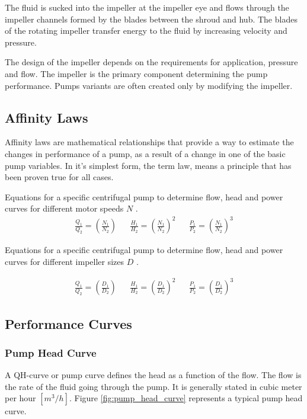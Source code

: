 The fluid is sucked into the impeller at the impeller eye and flows through the impeller channels formed by the 
blades between the shroud and hub.
The blades of the rotating impeller transfer energy to the fluid by increasing velocity and pressure.

The design of the impeller depends on the requirements for application, pressure and flow.
The impeller is the primary component determining the pump performance. 
Pumps variants are often created only by modifying the impeller.

\subsection{Affinity Laws}
Affinity laws are mathematical relationships that provide a way to estimate the changes in performance of a pump, 
as a result of a change in one of the basic pump variables.
In it's simplest form, the term law, means a principle that has been proven true for all cases.

Equations for a specific centrifugal pump to determine flow, head and power curves for different motor speeds $N$ \cite{Volk2014}.
\begin{align*}
	\frac{Q_1}{Q_2} = \left(\frac{N_1}{N_2}\right)   &&
	\frac{H_1}{H_2} = \left(\frac{N_1}{N_2}\right)^2 &&
	\frac{P_1}{P_2} = \left(\frac{N_1}{N_2}\right)^3	
\end{align*} 

Equations for a specific centrifugal pump to determine flow, head and power curves for different impeller sizes $D$ \cite{Volk2014}.

\begin{align*}
	\frac{Q_1}{Q_2} = \left(\frac{D_1}{D_2}\right)   &&
	\frac{H_1}{H_2} = \left(\frac{D_1}{D_2}\right)^2 &&
	\frac{P_1}{P_2} = \left(\frac{D_1}{D_2}\right)^3
\end{align*} 

\subsection{Performance Curves}
\subsubsection{Pump Head Curve}
A QH-curve or pump curve defines the head as a function of the flow. The flow is the rate of the fluid going through the 
pump. It is generally stated in cubic meter per hour $[m^{3}/h]$. Figure \ref{fig:pump_head_curve} represents a typical pump head curve.
